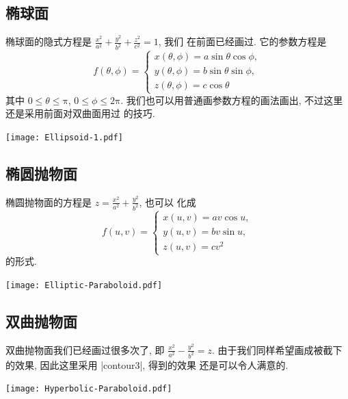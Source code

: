 \documentclass{ctexbook}
\let\leq\leqslant
\begin{document}
\subsection{椭球面}
椭球面的隐式方程是
$\frac{x^{2}}{a^{2}}+\frac{y^{2}}{b^{2}}+\frac{z^{2}}{c^{2}}=1$, 我们
在前面已经画过. 它的参数方程是
\begin{equation}
  f(\theta,\phi)=\left\{
    \begin{array}{ll}
      x(\theta,\phi)=a\sin\theta\cos\phi,\\
      y(\theta,\phi)=b\sin\theta\sin\phi,\\
      z(\theta,\phi)=c\cos\theta
    \end{array}\right.
\end{equation}
其中 $0\leq\theta\leq\mathrm{\pi}$, $0\leq\phi\leq\mathrm{2\pi}$.
我们也可以用普通画参数方程的画法画出, 不过这里还是采用前面对双曲面用过
的技巧.
\begin{center}\texttt{[image: Ellipsoid-1.pdf]}\end{center}%


\subsection{椭圆抛物面}
椭圆抛物面的方程是 $z=\frac{x^{2}}{a^{2}}+\frac{y^{2}}{b^{2}}$, 也可以
化成
\begin{equation}
  f(u,v)=\left\{
    \begin{array}{ll}
      x(u,v)=a v \cos u,\\
      y(u,v)=b v \sin u,\\
      z(u,v)=c v^{2}
    \end{array}\right.
\end{equation}
的形式.
\begin{center}\texttt{[image: Elliptic-Paraboloid.pdf]}\end{center}%


\subsection{双曲抛物面}
双曲抛物面我们已经画过很多次了, 即
$\frac{x^{2}}{a^{2}}-\frac{y^{2}}{b^{2}}=z$.
由于我们同样希望画成被截下的效果, 因此这里采用 |contour3|, 得到的效果
还是可以令人满意的.
\begin{center}\texttt{[image: Hyperbolic-Paraboloid.pdf]}\end{center}%

\end{document}
